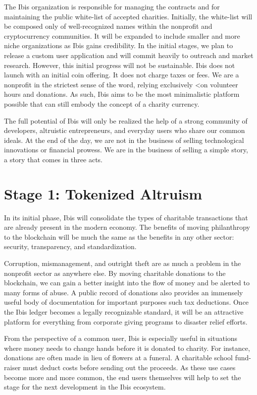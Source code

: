 \documentclass{article} \usepackage{parskip}
\begin{document}
The Ibis organization is responsible for managing the contracts and for
maintaining the public white-list of accepted charities. Initially, the
white-list will be composed only of well-recognized names within the nonprofit
and cryptocurrency communities. It will be expanded to include smaller and more
niche organizations as Ibis gains credibility. In the initial stages, we plan
to release a custom user application and will commit heavily to outreach and
market research. However, this initial progress will not be sustainable. Ibis
does not launch with an initial coin offering. It does not charge taxes or
fees. We are a nonprofit in the strictest sense of the word, relying exclusively
<on volunteer hours and donations. As such, Ibis aims to be the most minimalistic
platform possible that can still embody the concept of a charity currency.

The full potential of Ibis will only be realized the help of a strong community
of developers, altruistic entrepreneurs, and everyday users who share our common
ideals. At the end of the day, we are not in the business of selling
technological innovations or financial prowess. We are in the business of
selling a simple story, a story that comes in three acts.

\section{Stage 1: Tokenized Altruism}

In its initial phase, Ibis will consolidate the types of charitable transactions
that are already present in the modern economy. The benefits of moving
philanthropy to the blockchain will be much the same as the benefits in any
other sector: security, transparency, and standardization.

Corruption, mismanagement, and outright theft are as much a problem in the
nonprofit sector as anywhere else. By moving charitable donations to the
blockchain, we can gain a better insight into the flow of money and be alerted
to many forms of abuse. A public record of donations also provides an immensely
useful body of documentation for important purposes such tax deductions. Once
the Ibis ledger becomes a legally recognizable standard, it will be an
attractive platform for everything from corporate giving programs to disaster
relief efforts.

From the perspective of a common user, Ibis is especially useful in situations
where money needs to change hands before it is donated to charity. For instance,
donations are often made in lieu of flowers at a funeral. A charitable school
fund-raiser must deduct costs before sending out the proceeds. As these use
cases become more and more common, the end users themselves will help to set the
stage for the next development in the Ibis ecosystem.
\end{document}

